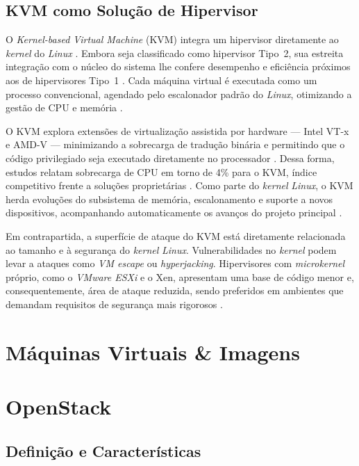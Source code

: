 \subsection{KVM como Solução de Hipervisor}

O \textit{Kernel-based Virtual Machine} (KVM) integra um hipervisor diretamente ao \textit{kernel} do \textit{Linux} \cite{carissimi2008}. Embora seja classificado como hipervisor Tipo~2, sua estreita integração com o núcleo do sistema lhe confere desempenho e eficiência próximos aos de hipervisores Tipo~1 \cite{chawla2025, kominos2017}. Cada máquina virtual é executada como um processo convencional, agendado pelo escalonador padrão do \textit{Linux}, otimizando a gestão de CPU e memória \cite{anand2013}.

O KVM explora extensões de virtualização assistida por hardware — Intel VT-x e AMD-V — minimizando a sobrecarga de tradução binária e permitindo que o código privilegiado seja executado diretamente no processador \cite{chawla2025, carissimi2008}. Dessa forma, estudos relatam sobrecarga de CPU em torno de 4\% para o KVM, índice competitivo frente a soluções proprietárias \cite{chawla2025}. Como parte do \textit{kernel} \textit{Linux}, o KVM herda evoluções do subsistema de memória, escalonamento e suporte a novos dispositivos, acompanhando automaticamente os avanços do projeto principal \cite{anand2013, arora2014}.

Em contrapartida, a superfície de ataque do KVM está diretamente relacionada ao tamanho e à segurança do \textit{kernel} \textit{Linux}. Vulnerabilidades no \textit{kernel} podem levar a ataques como \textit{VM escape} ou \textit{hyperjacking}. Hipervisores com \textit{microkernel} próprio, como o \textit{VMware ESXi} e o Xen, apresentam uma base de código menor e, consequentemente, área de ataque reduzida, sendo preferidos em ambientes que demandam requisitos de segurança mais rigorosos \cite{chawla2025}.

\section{Máquinas Virtuais \& Imagens}

\section{OpenStack}

\subsection{Definição e Características}

